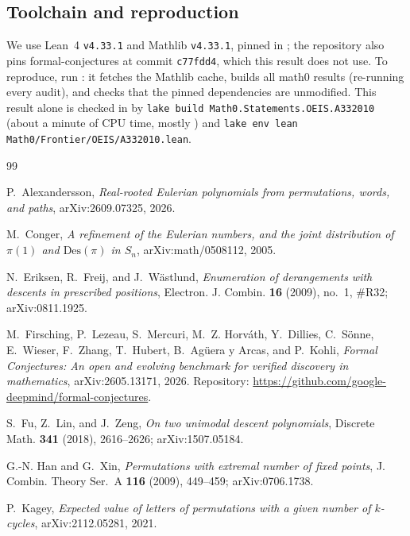 \documentclass[11pt]{amsart}
\theoremstyle{plain}
\theoremstyle{definition}
\begin{document}
\subsection*{Toolchain and reproduction}
We use Lean~4 \cite{Lean4} \texttt{v4.33.1} and Mathlib \cite{Mathlib} \texttt{v4.33.1}, pinned in ; the repository also pins formal-conjectures \cite{FC} at commit \texttt{c77fdd4}, which this result does not use.
To reproduce, run : it fetches the Mathlib cache, builds all math0 results (re-running every audit), and checks that the pinned dependencies are unmodified. This result alone is checked in  by \texttt{lake build Math0.Statements.OEIS.A332010} (about a minute of CPU time, mostly ) and \texttt{lake env lean Math0/Frontier/OEIS/A332010.lean}.

{\footnotesize\raggedright
\begin{thebibliography}{99}

P.~Alexandersson, \emph{Real-rooted Eulerian polynomials from permutations, words, and paths}, arXiv:2609.07325, 2026.

M.~Conger, \emph{A refinement of the Eulerian numbers, and the joint distribution of $\pi(1)$ and $\mathrm{Des}(\pi)$ in $S_n$}, arXiv:math/0508112, 2005.

N.~Eriksen, R.~Freij, and J.~W\"astlund, \emph{Enumeration of derangements with descents in prescribed positions}, Electron. J. Combin. \textbf{16} (2009), no.~1, \#R32; arXiv:0811.1925.

M.~Firsching, P.~Lezeau, S.~Mercuri, M.~Z. Horv\'ath, Y.~Dillies, C.~S\"onne, E.~Wieser, F.~Zhang, T.~Hubert, B.~Ag\"uera y Arcas, and P.~Kohli, \emph{Formal Conjectures: An open and evolving benchmark for verified discovery in mathematics}, arXiv:2605.13171, 2026. Repository: \url{https://github.com/google-deepmind/formal-conjectures}.

S.~Fu, Z.~Lin, and J.~Zeng, \emph{On two unimodal descent polynomials}, Discrete Math. \textbf{341} (2018), 2616--2626; arXiv:1507.05184.

G.-N. Han and G.~Xin, \emph{Permutations with extremal number of fixed points}, J. Combin. Theory Ser.~A \textbf{116} (2009), 449--459; arXiv:0706.1738.

P.~Kagey, \emph{Expected value of letters of permutations with a given number of $k$-cycles}, arXiv:2112.05281, 2021.


\end{thebibliography}}
\end{document}
